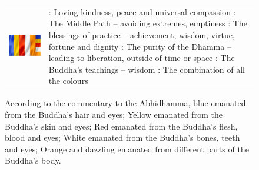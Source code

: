 \begin{figure}[H]
\begin{tabular*}{\textwidth}{L{\tabcolsep} L{\tabcolsep}}

\includegraphics[width=1\linewidth]{./Diagrams/Flag} & : Loving kindness, peace and universal compassion\newline
{}: The Middle Path – avoiding extremes, emptiness\newline
{}: The blessings of practice – achievement, wisdom, virtue, fortune and dignity\newline
{}: The purity of the Dhamma – leading to liberation, outside of time or space\newline
{}: The Buddha’s teachings – wisdom\newline
{}: The combination of all the colours\\

\end{tabular*}

\caption{According to the commentary to the Abhidhamma, blue emanated from the Buddha’s hair and eyes; Yellow emanated from the Buddha’s skin and eyes; Red emanated from the Buddha’s flesh, blood and eyes; White emanated from the Buddha’s bones, teeth and eyes; Orange and dazzling emanated from different parts of the Buddha’s body.}
\label{fig:Flag}
\end{figure}

\pagebreak


